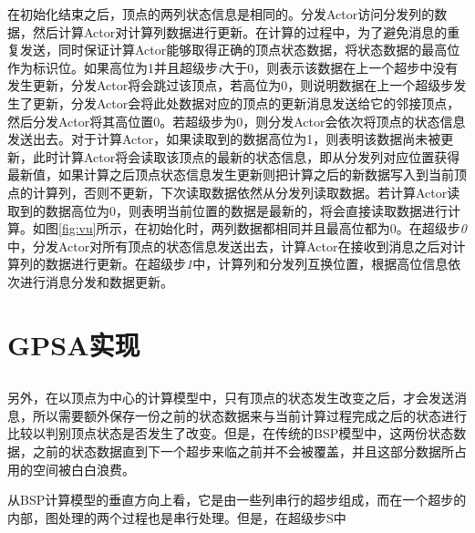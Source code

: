 在初始化结束之后，顶点的两列状态信息是相同的。分发Actor访问分发列的数据，然后计算Actor对计算列数据进行更新。在计算的过程中，为了避免消息的重复发送，同时保证计算Actor能够取得正确的顶点状态数据，将状态数据的最高位作为标识位。如果高位为1并且超级步\textit{i}大于0，则表示该数据在上一个超步中没有发生更新，分发Actor将会跳过该顶点，若高位为0，则说明数据在上一个超级步发生了更新，分发Actor会将此处数据对应的顶点的更新消息发送给它的邻接顶点，然后分发Actor将其高位置0。若超级步为0，则分发Actor会依次将顶点的状态信息发送出去。对于计算Actor，如果读取到的数据高位为1，则表明该数据尚未被更新，此时计算Actor将会读取该顶点的最新的状态信息，即从分发列对应位置获得最新值，如果计算之后顶点状态信息发生更新则把计算之后的新数据写入到当前顶点的计算列，否则不更新，下次读取数据依然从分发列读取数据。若计算Actor读取到的数据高位为0，则表明当前位置的数据是最新的，将会直接读取数据进行计算。如图\ref{fig:vu}所示，在初始化时，两列数据都相同并且最高位都为0。在超级步\textit{0}中，分发Actor对所有顶点的状态信息发送出去，计算Actor在接收到消息之后对计算列的数据进行更新。在超级步\textit{1}中，计算列和分发列互换位置，根据高位信息依次进行消息分发和数据更新。



\section{GPSA实现}
\subsection{}

另外，在以顶点为中心的计算模型中，只有顶点的状态发生改变之后，才会发送消息，所以需要额外保存一份之前的状态数据来与当前计算过程完成之后的状态进行比较以判别顶点状态是否发生了改变。但是，在传统的BSP模型中，这两份状态数据，之前的状态数据直到下一个超步来临之前并不会被覆盖，并且这部分数据所占用的空间被白白浪费。

从BSP计算模型的垂直方向上看，它是由一些列串行的超步组成，而在一个超步的内部，图处理的两个过程也是串行处理。但是，在超级步S中
